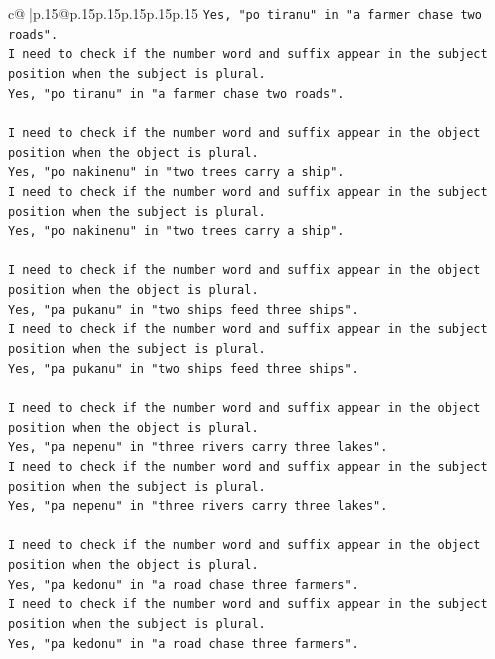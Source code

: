 \documentclass{article}
\begin{document}
{\begin{supertabular}{c@{$\;$}|p{.15\linewidth}@{}p{.15\linewidth}p{.15\linewidth}p{.15\linewidth}p{.15\linewidth}p{.15\linewidth}}
{{{\texttt{Yes, "po tiranu" in "a farmer chase two roads".} \\
\texttt{I need to check if the number word and suffix appear in the subject position when the subject is plural.} \\
\texttt{Yes, "po tiranu" in "a farmer chase two roads".} \\
\\ 
\texttt{I need to check if the number word and suffix appear in the object position when the object is plural.} \\
\texttt{Yes, "po nakinenu" in "two trees carry a ship".} \\
\texttt{I need to check if the number word and suffix appear in the subject position when the subject is plural.} \\
\texttt{Yes, "po nakinenu" in "two trees carry a ship".} \\
\\ 
\texttt{I need to check if the number word and suffix appear in the object position when the object is plural.} \\
\texttt{Yes, "pa pukanu" in "two ships feed three ships".} \\
\texttt{I need to check if the number word and suffix appear in the subject position when the subject is plural.} \\
\texttt{Yes, "pa pukanu" in "two ships feed three ships".} \\
\\ 
\texttt{I need to check if the number word and suffix appear in the object position when the object is plural.} \\
\texttt{Yes, "pa nepenu" in "three rivers carry three lakes".} \\
\texttt{I need to check if the number word and suffix appear in the subject position when the subject is plural.} \\
\texttt{Yes, "pa nepenu" in "three rivers carry three lakes".} \\
\\ 
\texttt{I need to check if the number word and suffix appear in the object position when the object is plural.} \\
\texttt{Yes, "pa kedonu" in "a road chase three farmers".} \\
\texttt{I need to check if the number word and suffix appear in the subject position when the subject is plural.} \\
\texttt{Yes, "pa kedonu" in "a road chase three farmers".} \\
}}}
\end{supertabular}}
\end{document}

